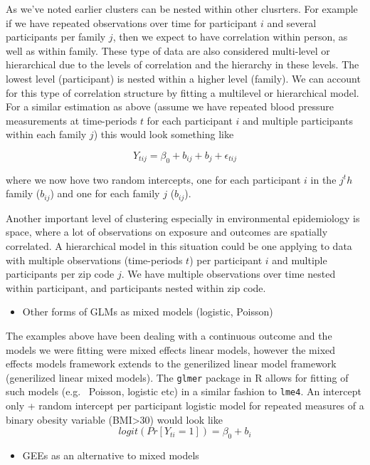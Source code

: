 \documentclass[
]{book}
\providecommand{\tightlist}{%
  \setlength{\itemsep}{0pt}\setlength{\parskip}{0pt}}
\begin{document}
As we've noted earlier clusters can be nested within other clusrters. For example
if we have repeated observations over time for participant \(i\) and several participants
per family \(j\), then we expect to have correlation within person, as well as within
family. These type of data are also considered multi-level or hierarchical due to
the levels of correlation and the hierarchy in these levels. The lowest level (participant)
is nested within a higher level (family). We can account for this type of correlation
structure by fitting a multilevel or hierarchical model. For a similar estimation
as above (assume we have repeated blood pressure measurements at time-periods \(t\)
for each participant \(i\) and multiple participants within each family \(j\)) this
would look something like

\[
Y_{tij} = \beta_{0} + b_{ij} + b_{j} + \epsilon_{tij} 
\]

where we now hove two random intercepts, one for each participant \(i\) in the \(j^th\)
family (\(b_{ij}\)) and one for each family \(j\) (\(b_{ij}\)).

Another important level of clustering especially in environmental epidemiology is
space, where a lot of observations on exposure and outcomes are spatially correlated.
A hierarchical model in this situation could be one applying to data with multiple
observations (time-periods \(t\)) per participant \(i\) and multiple participants per
zip code \(j\). We have multiple observations over time nested within participant,
and participants nested within zip code.

\begin{itemize}
\tightlist
\item
  Other forms of GLMs as mixed models (logistic, Poisson)
\end{itemize}

The examples above have been dealing with a continuous outcome and the models we
were fitting were mixed effects linear models, however the mixed effects models
framework extends to the generilized linear model framework (generilized linear
mixed models). The \texttt{glmer} package in R allows for fitting of such models (e.g.~
Poisson, logistic etc) in a similar fashion to \texttt{lme4}. An intercept only + random
intercept per participant logistic model for repeated measures of a binary obesity variable (BMI\textgreater30) would look like
\[
logit(Pr[Y_{ti}=1]) = \beta_{0} + b_{i} 
\]

\begin{itemize}
\tightlist
\item
  GEEs as an alternative to mixed models
\end{itemize}
\end{document}
